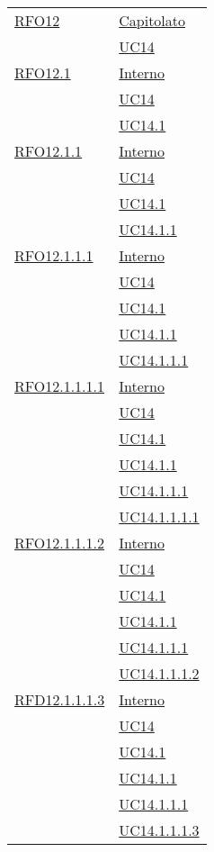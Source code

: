 \begin{longtable}{|>{\centering}m{5cm}|m{5cm}<{\centering}|}
 \hyperlink{RFO12}{RFO12} 
  & \hyperlink{Capitolato}{Capitolato}\\
& \hyperref[UC14]{UC14}\\\hline

 \hyperlink{RFO12.1}{RFO12.1} 
 & \hyperlink{Interno}{Interno}\\
& \hyperref[UC14]{UC14}\\
& \hyperref[UC14.1]{UC14.1}\\\hline

 \hyperlink{RFO12.1.1}{RFO12.1.1} 
 & \hyperlink{Interno}{Interno}\\
& \hyperref[UC14]{UC14}\\
& \hyperref[UC14.1]{UC14.1}\\
& \hyperref[UC14.1.1]{UC14.1.1}\\\hline

 \hyperlink{RFO12.1.1.1}{RFO12.1.1.1} 
 & \hyperlink{Interno}{Interno}\\
& \hyperref[UC14]{UC14}\\
& \hyperref[UC14.1]{UC14.1}\\
& \hyperref[UC14.1.1]{UC14.1.1}\\
& \hyperref[UC14.1.1.1]{UC14.1.1.1}\\\hline

 \hyperlink{RFO12.1.1.1.1}{RFO12.1.1.1.1} 
 & \hyperlink{Interno}{Interno}\\
& \hyperref[UC14]{UC14}\\
& \hyperref[UC14.1]{UC14.1}\\
& \hyperref[UC14.1.1]{UC14.1.1}\\
& \hyperref[UC14.1.1.1]{UC14.1.1.1}\\
& \hyperref[UC14.1.1.1.1]{UC14.1.1.1.1}\\\hline

 \hyperlink{RFO12.1.1.1.2}{RFO12.1.1.1.2} 
 & \hyperlink{Interno}{Interno}\\
& \hyperref[UC14]{UC14}\\
& \hyperref[UC14.1]{UC14.1}\\
& \hyperref[UC14.1.1]{UC14.1.1}\\
& \hyperref[UC14.1.1.1]{UC14.1.1.1}\\
& \hyperref[UC14.1.1.1.2]{UC14.1.1.1.2}\\\hline

 \hyperlink{RFD12.1.1.1.3}{RFD12.1.1.1.3} 
 & \hyperlink{Interno}{Interno}\\
& \hyperref[UC14]{UC14}\\
& \hyperref[UC14.1]{UC14.1}\\
& \hyperref[UC14.1.1]{UC14.1.1}\\
& \hyperref[UC14.1.1.1]{UC14.1.1.1}\\
& \hyperref[UC14.1.1.1.3]{UC14.1.1.1.3}\\\hline


\end{longtable}
